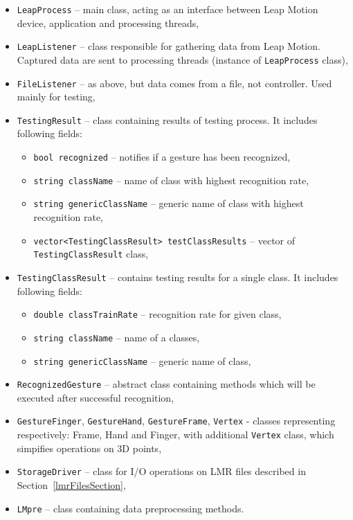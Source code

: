 \begin{itemize}
\item \texttt{LeapProcess} -- main class, acting as an interface between Leap Motion device, application and processing threads,
\item \texttt{LeapListener} -- class responsible for gathering data from Leap Motion. Captured data are sent to processing threads (instance of \texttt{LeapProcess} class),
\item \texttt{FileListener} -- as above, but data comes from a file, not controller. Used mainly for testing,
\item \texttt{TestingResult} -- class containing results of testing process. It includes following fields:
\begin{itemize}
\item \texttt{bool recognized} -- notifies if a gesture has been recognized,
\item \texttt{string className} -- name of class with highest recognition rate,
\item \texttt{string genericClassName} -- generic name of class with highest recognition rate,
\item \texttt{vector\textless TestingClassResult\textgreater~testClassResults} -- vector of \texttt{TestingClassResult} class,
\end{itemize}
\item \texttt{TestingClassResult} -- contains testing results for a single class. It includes following fields:
\begin{itemize}
\item \texttt{double classTrainRate} -- recognition rate for given class,
\item \texttt{string className} -- name of a classes,
\item \texttt{string genericClassName} -- generic name of class,
\end{itemize}

\item \texttt{RecognizedGesture} -- abstract class containing methods which will be executed after successful recognition,
\item \texttt{GestureFinger}, \texttt{GestureHand}, \texttt{GestureFrame}, \texttt{Vertex} - classes representing respectively: Frame, Hand and Finger, with additional \texttt{Vertex} class, which simpifies operations on 3D points,
\item \texttt{StorageDriver} -- class for I/O operations on LMR files described in Section~\ref{lmrFilesSection},
\item \texttt{LMpre} -- class containing data preprocessing methods.

\end{itemize}

